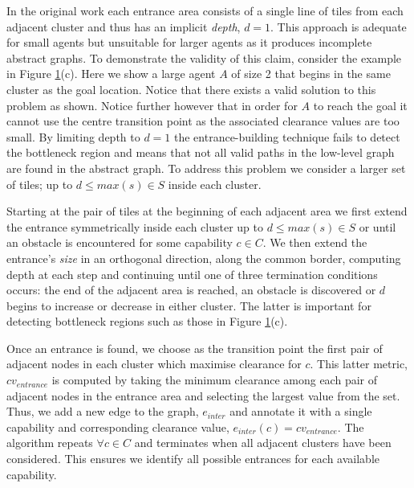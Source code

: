 {\begin{figure}[htbp]
        \label{aha-fig:clustersandentrances}
\end{figure}
\par \indent
In the original work each entrance area consists of a single line of tiles from each adjacent cluster and thus has an implicit \emph{depth}, $d = 1$.
This approach is adequate for small agents but unsuitable for larger agents as it produces incomplete abstract graphs. 
To demonstrate the validity of this claim, consider the example in Figure \ref{aha-fig:clustersandentrances}(c). 
Here we show a large agent $A$ of size 2 that begins in the same cluster as the goal location. 
Notice that there exists a valid solution to this problem as shown. 
Notice further however that in order for $A$ to reach the goal it cannot use the centre transition point as the associated clearance values are too small.
By limiting depth to $d = 1$ the entrance-building technique fails to detect the bottleneck region and means that not all valid paths in the low-level graph are found in the abstract graph.
To address this problem we consider a larger set of tiles; up to $d \leq max(s) \in S$  inside each cluster.
\par \indent
Starting at the pair of tiles at the beginning of each adjacent area we first extend the entrance symmetrically inside each cluster up to $d \leq max(s) \in S$ or until an obstacle is encountered for some capability $c \in C$.
We then extend the entrance's \emph{size} in an orthogonal direction, along the common border, computing depth at each step and continuing until one of three termination conditions occurs: the end of the adjacent area is reached, an obstacle is discovered or $d$ begins to increase or decrease in either cluster. 
The latter is important for detecting bottleneck regions such as those in Figure \ref{aha-fig:clustersandentrances}(c).
\par \indent
Once an entrance is found, we choose as the transition point the first pair of adjacent nodes in each cluster which maximise clearance for $c$.
This latter metric, $cv_{entrance}$ is computed by taking the minimum clearance among each pair of adjacent nodes in the entrance area and selecting the largest value from the set. 
Thus, we add a new edge to the graph, $e_{inter}$ and annotate it with a single capability and corresponding clearance value, $e_{inter}(c) = cv_{entrance}$. 
The algorithm repeats $\forall c \in C$ and terminates when all adjacent clusters have been considered. 
This ensures we identify all possible entrances for each available capability.
\par \indent
}
